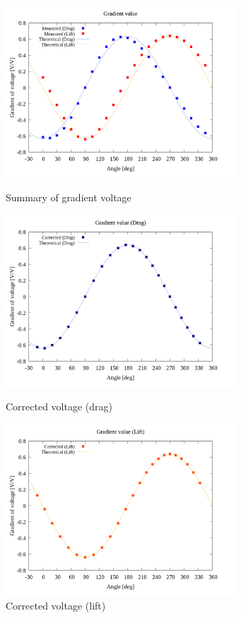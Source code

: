 \documentclass[twocolumn,a4j]{jsarticle}
\begin{document}
\begin{figure}[htbp]
    \footnotesize
    \begin{center}
        \includegraphics[width=86mm]{../graphes/offset_x=5_y=0/20/20_adjust-value.png}
        \caption{Summary of gradient voltage}
        \includegraphics[width=86mm]{../graphes/offset_x=5_y=0/21/21-2_corrected_offset_drag.png}
        \caption{Corrected voltage (drag)}
        \includegraphics[width=86mm]{../graphes/offset_x=5_y=0/21/21-2_corrected_offset_lift.png}
        \caption{Corrected voltage (lift)}
    \end{center}
\end{figure}

\newpage
\end{document}
